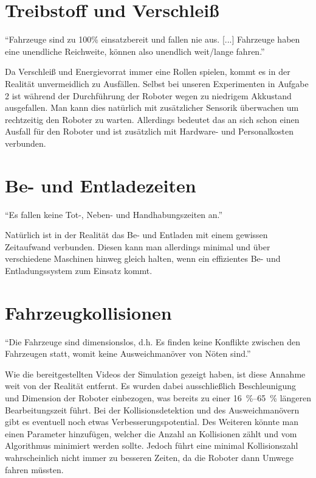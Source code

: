 \documentclass[ngerman]{tudscrreprt}
\begin{document}
\section{Treibstoff und Verschleiß}
\begin{displayquote}
    ``Fahrzeuge sind zu 100\% einsatzbereit und fallen nie aus. [...] Fahrzeuge haben eine unendliche Reichweite, können also unendlich weit/lange fahren.'' \cite{aufgabenstellung}
\end{displayquote}
%
Da Verschleiß und Energievorrat immer eine Rollen spielen, kommt es in der Realität unvermeidlich zu Ausfällen. Selbst bei unseren Experimenten in Aufgabe 2 ist während der Durchführung der Roboter wegen zu niedrigem Akkustand ausgefallen. Man kann dies natürlich mit zusätzlicher Sensorik überwachen um rechtzeitig den Roboter zu warten. Allerdings bedeutet das an sich schon einen Ausfall für den Roboter und ist zusätzlich mit Hardware- und Personalkosten verbunden.

\section{Be- und Entladezeiten}
\begin{displayquote}
    ``Es fallen keine Tot-, Neben- und Handhabungszeiten an.'' \cite{aufgabenstellung}
\end{displayquote}
%
Natürlich ist in der Realität das Be- und Entladen mit einem gewissen Zeitaufwand verbunden. Diesen kann man allerdings minimal und über verschiedene Maschinen hinweg gleich halten, wenn ein effizientes Be- und Entladungssystem zum Einsatz kommt.

\section{Fahrzeugkollisionen}
\begin{displayquote}
    ``Die Fahrzeuge sind dimensionslos, d.h. Es finden keine Konflikte zwischen den Fahrzeugen statt, womit keine Ausweichmanöver von Nöten sind.'' \cite{aufgabenstellung}
\end{displayquote}
%
Wie die bereitgestellten Videos der Simulation gezeigt haben, ist diese Annahme weit von der Realität entfernt. Es wurden dabei ausschließlich Beschleunigung und Dimension der Roboter einbezogen, was bereits zu einer \SIrange{16}{65}{\percent} längeren Bearbeitungszeit führt. Bei der Kollisionsdetektion und des Ausweichmanövern gibt es eventuell noch etwas Verbesserungspotential. Des Weiteren könnte man einen Parameter hinzufügen, welcher die Anzahl an Kollisionen zählt und vom Algorithmus minimiert werden sollte. Jedoch führt eine minimal Kollisionszahl wahrscheinlich nicht immer zu besseren Zeiten, da die Roboter dann Umwege fahren müssten.
\end{document}
